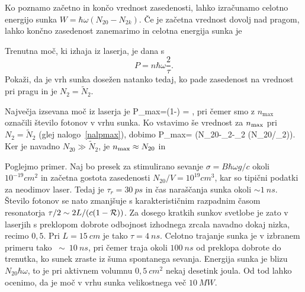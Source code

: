 Ko poznamo začetno in končo vrednost zasedenosti, lahko izračunamo 
celotno energijo sunka $W=\hbar \omega (N_{20}-N_{2k})$. Če je začetna vrednost
dovolj nad pragom, lahko končno zasedenost zanemarimo in celotna energija sunka je 
\begin{definition}
\label{nalpmax}
Trenutna moč, ki izhaja iz laserja, je dana s 
\begin{equation}
P=n \hbar \omega \frac{2}{\tau}.
\end{equation}
Pokaži, da je vrh sunka dosežen natanko tedaj, ko pade zasedenost na vrednost pri 
pragu in je $N_{2}=\tilde{N}_{2}$. 
\end{definition}

Največja izsevana moč iz laserja je 
\beq
P_{\rm max}=\left(1-\right) = 
,
\eeq
pri čemer smo z $n_\textrm{max}$ označili število fotonov v vrhu sunka. 
Ko vstavimo še vrednost za $n_{\rm max}$ pri $N_{2}=\tilde{N}_{2}$ (glej 
nalogo~\ref{nalpmax}), dobimo
\beq
P_{\rm max}=\frac {2\hbar \omega}{\tau} \left(N_{20}-_{2}-_{2}
\ln (N_{20}/_{2})\right).
\eeq
Ker je navadno $N_{20}\gg \tilde{N}_2$, je $n_{\rm max} \approx N_{20}$
in 

Poglejmo primer. Naj bo presek za stimulirano sevanje $\sigma=B\hbar \omega g/c$ 
okoli $10^{-19}\si{cm}^{2}$ in začetna gostota zasedenosti $N_{20}/V=10^{19}\si{cm}^3$,
kar so tipični podatki za neodimov laser.  Tedaj 
je $\tau_{r}=30~\si{ps}$ in čas naraščanja
sunka okoli $\sim 1~\si{ns}$. Število fotonov se nato zmanjšuje s
karakterističnim razpadnim časom resonatorja $\tau /2\sim 2L/(c(1-{\cal R}))$. 
Za dosego kratkih sunkov svetlobe je zato v laserjih s preklopom dobrote odbojnost 
izhodnega zrcala navadno dokaj nizka, recimo $0,5$. Pri $L=15~\si{cm}$ je tako $\tau=4~\si{ns}$.
Celotno trajanje sunka je v izbranem primeru tako $~\sim~10~\si{ns}$, pri
čemer traja okoli $100~\si{ns}$ od preklopa dobrote do trenutka, ko sunek zraste iz šuma
spontanega sevanja. Energija sunka je blizu $N_{20}\hbar \omega $, to je pri
aktivnem volumnu $0,5~\si{cm}^2$ nekaj desetink joula. Od tod lahko ocenimo, da je
moč v vrhu sunka velikostnega več $10~\si{MW}$.

